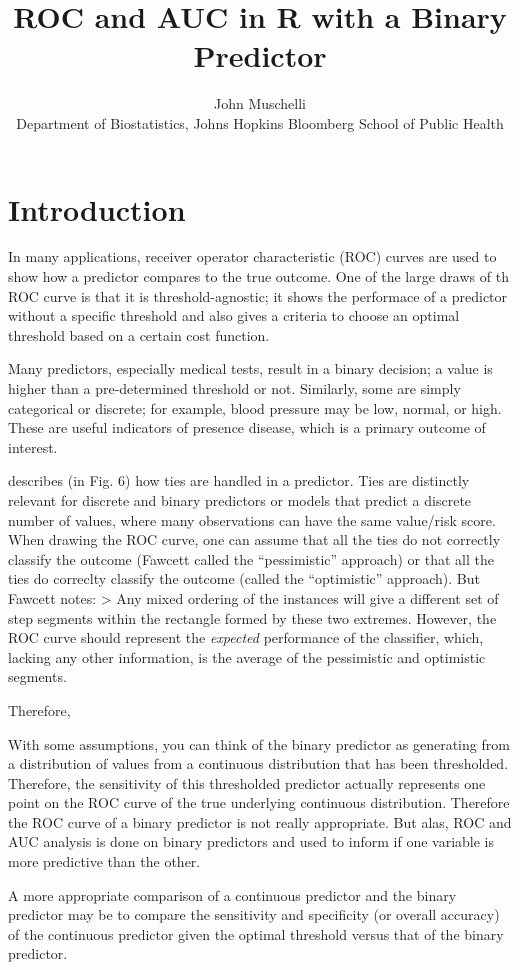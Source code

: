 \documentclass[article]{jss}
\author{
John Muschelli\\Department of Biostatistics, Johns Hopkins Bloomberg School of Public
Health
}
\title{ROC and AUC in R with a Binary Predictor}
\begin{document}
\hypertarget{introduction}{%
\section{Introduction}\label{introduction}}

In many applications, receiver operator characteristic (ROC) curves are
used to show how a predictor compares to the true outcome. One of the
large draws of th ROC curve is that it is threshold-agnostic; it shows
the performace of a predictor without a specific threshold and also
gives a criteria to choose an optimal threshold based on a certain cost
function.

Many predictors, especially medical tests, result in a binary decision;
a value is higher than a pre-determined threshold or not. Similarly,
some are simply categorical or discrete; for example, blood pressure may
be low, normal, or high. These are useful indicators of presence
disease, which is a primary outcome of interest.

\citet{fawcett2006introduction} describes (in Fig. 6) how ties are
handled in a predictor. Ties are distinctly relevant for discrete and
binary predictors or models that predict a discrete number of values,
where many observations can have the same value/risk score. When drawing
the ROC curve, one can assume that all the ties do not correctly
classify the outcome (Fawcett called the ``pessimistic'' approach) or
that all the ties do correclty classify the outcome (called the
``optimistic'' approach). But Fawcett notes: \textgreater{} Any mixed
ordering of the instances will give a different set of step segments
within the rectangle formed by these two extremes. However, the ROC
curve should represent the \emph{expected} performance of the
classifier, which, lacking any other information, is the average of the
pessimistic and optimistic segments.

Therefore,

With some assumptions, you can think of the binary predictor as
generating from a distribution of values from a continuous distribution
that has been thresholded. Therefore, the sensitivity of this
thresholded predictor actually represents one point on the ROC curve of
the true underlying continuous distribution. Therefore the ROC curve of
a binary predictor is not really appropriate. But alas, ROC and AUC
analysis is done on binary predictors and used to inform if one variable
is more predictive than the other.

A more appropriate comparison of a continuous predictor and the binary
predictor may be to compare the sensitivity and specificity (or overall
accuracy) of the continuous predictor given the optimal threshold versus
that of the binary predictor.
\end{document}
